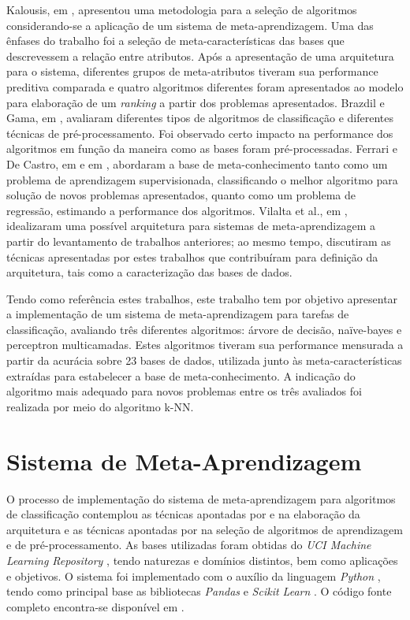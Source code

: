 \documentclass[runningheads]{llncs}
\begin{document}
Kalousis, em \cite{kalousis}, apresentou uma metodologia para a seleção de algoritmos considerando-se a aplicação de um sistema de meta-aprendizagem. Uma das ênfases do trabalho foi a seleção de meta-características das bases que descrevessem a relação entre atributos. Após a apresentação de uma arquitetura para o sistema, diferentes grupos de meta-atributos tiveram sua performance preditiva comparada e quatro algoritmos diferentes foram apresentados ao modelo para elaboração de um \emph{ranking} a partir dos problemas apresentados. Brazdil e Gama, em \cite{characterization}, avaliaram diferentes tipos de algoritmos de classificação e diferentes técnicas de pré-processamento. Foi observado certo impacto na performance dos algoritmos em função da maneira como as bases foram pré-processadas. Ferrari e De Castro, em \cite{estimation} e em \cite{recommendation}, abordaram a base de meta-conhecimento tanto como um problema de aprendizagem supervisionada, classificando o melhor algoritmo para solução de novos problemas apresentados, quanto como um problema de regressão, estimando a performance dos algoritmos. Vilalta et al., em \cite{support}, idealizaram uma possível arquitetura para sistemas de meta-aprendizagem a partir do levantamento de trabalhos anteriores; ao mesmo tempo, discutiram as técnicas apresentadas por estes trabalhos que contribuíram para definição da arquitetura, tais como a caracterização das bases de dados.

Tendo como referência estes trabalhos, este trabalho tem por objetivo apresentar a implementação de um sistema de meta-aprendizagem para tarefas de classificação, avaliando três diferentes algoritmos: árvore de decisão, naïve-bayes e perceptron multicamadas. Estes algoritmos tiveram sua performance mensurada a partir da acurácia sobre 23 bases de dados, utilizada junto às meta-características extraídas para estabelecer a base de meta-conhecimento. A indicação do algoritmo mais adequado para novos problemas entre os três avaliados foi realizada por meio do algoritmo k-NN.

\section{Sistema de Meta-Aprendizagem}

O processo de implementação do sistema de meta-aprendizagem para algoritmos de classificação contemplou as técnicas apontadas por \cite{kalousis} e \cite{support} na elaboração da arquitetura e as técnicas apontadas por \cite{kdd} na seleção de algoritmos de aprendizagem e de pré-processamento. As bases utilizadas foram obtidas do \emph{UCI Machine Learning Repository} \cite{uci}, tendo naturezas e domínios distintos, bem como aplicações e objetivos. O sistema foi implementado com o auxílio da linguagem \emph{Python} \cite{python}, tendo como principal base as bibliotecas \emph{Pandas} \cite{pandas} e \emph{Scikit Learn} \cite{sklearn}. O código fonte completo encontra-se disponível em \cite{github}.
\end{document}

